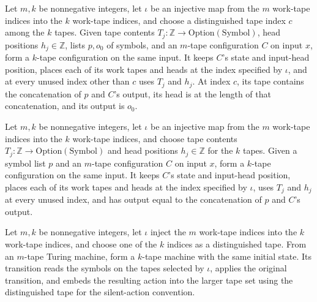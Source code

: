 \begin{definition}
\label{Turing.embedSilentCfg}
\leanok
{}
Let $m,k$ be nonnegative integers, let $\iota$ be an injective map from the $m$
work-tape indices into the $k$ work-tape indices, and choose a distinguished tape index
$c$ among the $k$ tapes. Given tape contents $T_j:\mathbb
Z\to\mathrm{Option}(\mathrm{Symbol})$, head positions $h_j\in\mathbb Z$, lists $p,o_0$
of symbols, and an $m$-tape configuration $C$ on input $x$, form a $k$-tape
configuration on the same input. It keeps $C$’s state and input-head position, places
each of its work tapes and heads at the index specified by $\iota$, and at every unused
index other than $c$ uses $T_j$ and $h_j$. At index $c$, its tape contains the
concatenation of $p$ and $C$’s output, its head is at the length of that concatenation,
and its output is $o_0$.
\end{definition}

\begin{definition}
\label{Turing.embedEmitCfg}
\leanok
{}
Let $m,k$ be nonnegative integers, let $\iota$ be an injective map from the $m$
work-tape indices into the $k$ work-tape indices, and choose tape contents $T_j:\mathbb
Z\to\mathrm{Option}(\mathrm{Symbol})$ and head positions $h_j\in\mathbb Z$ for the $k$
tapes. Given a symbol list $p$ and an $m$-tape configuration $C$ on input $x$, form a
$k$-tape configuration on the same input. It keeps $C$’s state and input-head position,
places each of its work tapes and heads at the index specified by $\iota$, uses $T_j$
and $h_j$ at every unused index, and has output equal to the concatenation of $p$ and
$C$’s output.
\end{definition}

\begin{definition}
\label{Turing.embedSilentTM}
\leanok
{}
Let $m,k$ be nonnegative integers, let $\iota$ inject the $m$ work-tape indices into the
$k$ work-tape indices, and choose one of the $k$ indices as a distinguished tape. From
an $m$-tape Turing machine, form a $k$-tape machine with the same initial state. Its
transition reads the symbols on the tapes selected by $\iota$, applies the original
transition, and embeds the resulting action into the larger tape set using the
distinguished tape for the silent-action convention.
\end{definition}

